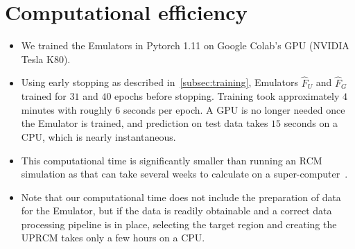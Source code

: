 \documentclass[a4paper,11pt,oneside]{report}
\begin{document}
\section{Computational efficiency}
\begin{itemize}
\item We trained the Emulators in Pytorch 1.11 on Google Colab's GPU (NVIDIA Tesla K80).
    \item Using early stopping as described in~\ref{subsec:training}, Emulators $\hat{F}_U$ and $\hat{F}_G$ trained for $31$ and $40$ epochs before stopping. Training took approximately $4$ minutes with roughly $6$ seconds per epoch. A GPU is no longer needed once the Emulator is trained, and prediction on test data takes $15$ seconds on a CPU, which is nearly instantaneous. 
    \item This computational time is significantly smaller than running an RCM simulation as that can take several weeks to calculate on a super-computer~\cite{Doury}. 
    \item Note that our computational time does not include the preparation of data for the Emulator, but if the data is readily obtainable and a correct data processing pipeline is in place, selecting the target region and creating the UPRCM takes only a few hours on a CPU.   
\end{itemize}
\end{document}
